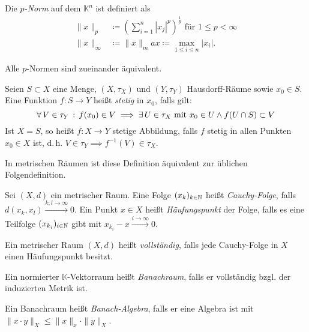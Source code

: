 \documentclass{cheat-sheet}
\newcommand{\K}{\mathbb{K}}
\newcommand{\convWith}[1]{\xrightarrow{#1 \to \infty}} %
\begin{document}
\begin{defn}
  Die \emph{$p$-Norm} auf dem $\K^n$ ist definiert als
  \begin{align*}
    \| x \|_p &\coloneqq \left( \sum_{i = 1}^n |x_j|^p \right)^{\frac{1}{p}} \text{ für } 1 \leq p < \infty \\
    \| x \|_{\infty} &\coloneqq \| x \|_max \coloneqq \max_{1 \leq i \leq n} |x_i|.
  \end{align*}
\end{defn}

\begin{bem}
  Alle $p$-Normen sind zueinander äquivalent.
\end{bem}

\begin{defn}
  Seien $S \subset X$ eine Menge, $(X, \tau_X)$ und $(Y, \tau_Y)$ Hausdorff-Räume sowie $x_0 \in S$. Eine Funktion $f : S \to Y$ heißt \emph{stetig} in $x_0$, falls gilt:
  \[ \forall \, {V \in \tau_Y} \,:\, f(x_0) \in V \implies \exists\,U \in \tau_X \text{ mit } x_0 \in U \wedge f(U \cap S) \subset V \]
  Ist $X = S$, so heißt $f : X \to Y$ stetige Abbildung, falls $f$ stetig in allen Punkten $x_0 \in X$ ist, d.\,h. $V \in \tau_Y \implies f^{-1}(V) \in \tau_X$.
\end{defn}

\begin{bem}
  In metrischen Räumen ist diese Definition äquivalent zur üblichen Folgendefinition.
\end{bem}

\begin{defn}
  Sei $(X, d)$ ein metrischer Raum. Eine Folge $(x_k)_{k \in \mathbb{N}}$ heißt \emph{Cauchy-Folge}, falls $d(x_k, x_l) \convWith{k, l} 0$. Ein Punkt $x \in X$ heißt \emph{Häufungspunkt} der Folge, falls es eine Teilfolge $(x_{k_i})_{i \in \mathbb{N}}$ gibt mit $x_{k_i} - x \convWith{i} 0$.
\end{defn}

\begin{defn}
  Ein metrischer Raum $(X, d)$ heißt \emph{vollständig}, falls jede Cauchy-Folge in $X$ einen Häufungspunkt besitzt.
\end{defn}

\begin{defn}
  Ein normierter $\K$-Vektorraum heißt \emph{Banachraum}, falls er vollständig bzgl. der induzierten Metrik ist.
\end{defn}

\begin{defn}
  Ein Banachraum heißt \emph{Banach-Algebra}, falls er eine Algebra ist mit $\| x \cdot y \|_X \leq \| x \|_x \cdot \| y \|_X$.
\end{defn}
\end{document}
